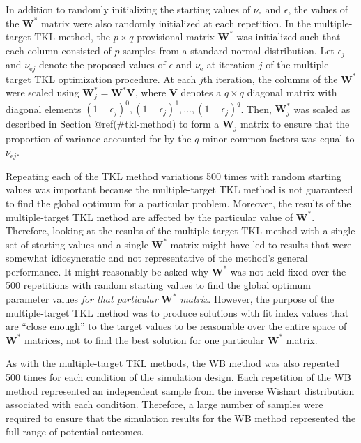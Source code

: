 \documentclass[11pt]{umnthesis}
\begin{document}
In addition to randomly initializing the starting values of \(\nu_{\textrm{e}}\) and \(\epsilon\), the values of the \(\mathbf{W}^*\) matrix were also randomly initialized at each repetition. In the multiple-target TKL method, the \(p \times q\) provisional matrix \(\mathbf{W}^*\) was initialized such that each column consisted of \(p\) samples from a standard normal distribution. Let \(\epsilon_j\) and \(\nu_{\textrm{e}j}\) denote the proposed values of \(\epsilon\) and \(\nu_{\textrm{e}}\) at iteration \(j\) of the multiple-target TKL optimization procedure. At each \(j\)th iteration, the columns of the \(\mathbf{W}^*\) were scaled using \(\mathbf{W}^*_j = \mathbf{W}^* \mathbf{V}\), where \(\mathbf{V}\) denotes a \(q \times q\) diagonal matrix with diagonal elements \((1-\epsilon_j)^0, (1-\epsilon_j)^1, \dots, (1-\epsilon_j)^q\). Then, \(\mathbf{W}^*_j\) was scaled as described in Section @ref(\#tkl-method) to form a \(\mathbf{W}_j\) matrix to ensure that the proportion of variance accounted for by the \(q\) minor common factors was equal to \(\nu_{\mathrm{e}j}\).

Repeating each of the TKL method variations 500 times with random starting values was important because the multiple-target TKL method is not guaranteed to find the global optimum for a particular problem. Moreover, the results of the multiple-target TKL method are affected by the particular value of \(\mathbf{W}^*\). Therefore, looking at the results of the multiple-target TKL method with a single set of starting values and a single \(\mathbf{W}^*\) matrix might have led to results that were somewhat idiosyncratic and not representative of the method's general performance. It might reasonably be asked why \(\mathbf{W}^*\) was not held fixed over the 500 repetitions with random starting values to find the global optimum parameter values \emph{for that particular} \(\mathbf{W}^*\) \emph{matrix}. However, the purpose of the multiple-target TKL method was to produce solutions with fit index values that are ``close enough'' to the target values to be reasonable over the entire space of \(\mathbf{W}^*\) matrices, not to find the best solution for one particular \(\mathbf{W}^*\) matrix.

As with the multiple-target TKL methods, the WB method was also repeated 500 times for each condition of the simulation design. Each repetition of the WB method represented an independent sample from the inverse Wishart distribution associated with each condition. Therefore, a large number of samples were required to ensure that the simulation results for the WB method represented the full range of potential outcomes.
\end{document}
